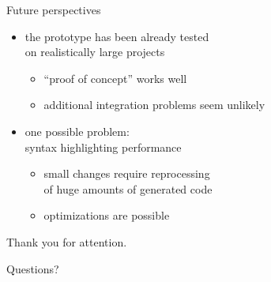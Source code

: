 \documentclass[10pt]{beamer}
\begin{document}
\begin{frame}{Future perspectives}
\begin{itemize}
\item the prototype has been already tested\\ on realistically large projects
	\begin{itemize}
		\item ``proof of concept'' works well
		\item additional integration problems seem unlikely
	\end{itemize}
\item one possible problem:\\ syntax highlighting performance
	\begin{itemize}
		\item small changes require reprocessing\\ of huge amounts of generated code
		\item optimizations are possible
	\end{itemize}
\end{itemize}
\end{frame}


\begin{frame}[standout]
  Thank you for attention.

  \small Questions?
\end{frame}
\end{document}
